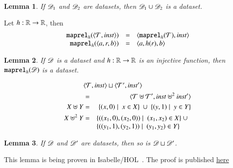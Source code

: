 \documentclass{elsarticle}
\newtheorem{lemma}{Lemma}
\begin{document}
\begin{lemma}
\label{lemma:graph_union_wellTyped_if_parts_wellTyped}
   If $\mathscr{D}_1$ and $\mathscr{D}_2$ are datasets, then $\mathscr{D}_1\cup\mathscr{D}_2$ is a dataset.
\end{lemma}

\begin{definition}
\label{def:map_labels_preserves_wellTypedness}
   Let $h:\mathbb{R}\rightarrow\mathbb{R}$, then
   \[\begin{array}{rcl}
      {\tt maprel}_{h}({\langle{\mathcal{T}},{\mathbin{\text{\it inst\/}}}\rangle})&=&\langle{{\tt maprel}_{h}({\mathcal{T}})},{\mathbin{\text{\it inst\/}}}\rangle\\
      {\tt maprel}_{h}({\langle{a},{r},{b}\rangle})&=&\langle{a},{h(r)},{b}\rangle
   \end{array}\]
\end{definition}

\begin{lemma}
\label{lemma:map_labels_preserves_wellTypedness}
   If $\mathscr{D}$ is a dataset and $h:\mathbb{R}\rightarrow\mathbb{R}$ is an injective function, then ${\tt maprel}_{h}({\mathscr{D}})$ is a dataset.
\end{lemma}

\begin{definition}
\begin{eqnarray}
   \rlap{$\pair{\triples}{\inst}\sqcup\pair{\triples'}{\inst'}$}\notag\\
   &=&\pair{\triples\uplus\triples'}{\inst\uplus^2\inst'}\notag\\
      X\uplus Y&=&\{(x,0)\mid\ x\in X\}\ \cup\ \{(y,1)\mid\ y\in Y\}\\
      X\uplus^2 Y&=&\begin{array}[t]{@{}l}\{((x_1,0),(x_2,0))\mid\ (x_1,x_2)\in X\}\ \cup\\ \{((y_1,1),(y_2,1))\mid\ (y_1,y_2)\in Y\}\end{array}
\end{eqnarray}
\end{definition}

\begin{lemma}
   If $\mathscr{D}$ and $\mathscr{D}'$ are datasets, then so is $\mathscr{D}\sqcup\mathscr{D}'$.
\end{lemma}
   This lemma is being proven in Isabelle/HOL~\cite{Isabelle}. The proof is published \href{location.domain}{here}
\end{document}

